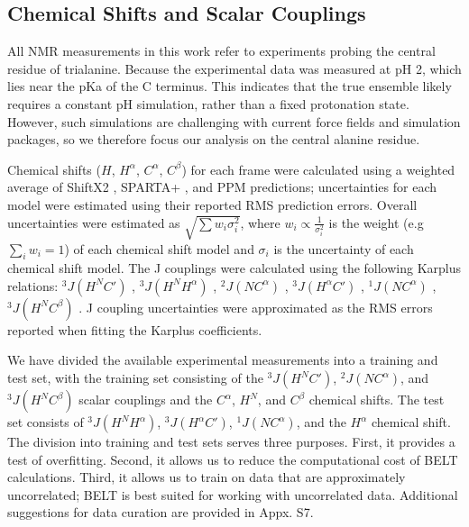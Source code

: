 \documentclass[11pt,titlepage]{article}
\begin{document}
\subsection*{Chemical Shifts and Scalar Couplings}

All NMR measurements in this work refer to experiments  \citep{Graf2007} probing the central residue of trialanine.  Because the experimental data was measured at pH 2, which lies near the pKa of the C terminus.  This indicates that the true ensemble likely requires a constant pH simulation, rather than a fixed protonation state.  However, such simulations are challenging with current force fields and simulation packages, so we therefore focus our analysis on the central alanine residue.  

Chemical shifts ($H$, $H^\alpha$, $C^\alpha$, $C^\beta$) for each frame were calculated using a weighted average of ShiftX2 \citep{han2011shiftx2}, SPARTA+  \citep{Shen2010}, and PPM \citep{li2012ppm} predictions; uncertainties for each model were estimated using their reported RMS prediction errors.  Overall uncertainties were estimated as $\sqrt{\sum w_i \sigma_i^2}$, where $w_i \propto \frac{1}{\sigma_i^2}$ is the weight (e.g $\sum_i w_i = 1$) of each chemical shift model and $\sigma_i$ is the uncertainty of each chemical shift model.  The J couplings were calculated using the following Karplus relations: $^3J(H^N C')$  \citep{vogeli2007limits}, $^3J(H^N H^\alpha)$  \citep{vogeli2007limits}, $^2J(N C^\alpha)$  \citep{Graf2007}, $^3J(H^\alpha C')$  \citep{Schmidt1999}, $^1J(N C^\alpha)$  \citep{Graf2007}, $^3J(H^N C^\beta)$  \citep{vogeli2007limits}.  J coupling uncertainties were approximated as the RMS errors reported when fitting the Karplus coefficients.  

We have divided the available experimental measurements into a training and test set, with the training set consisting of the $^3J(H^N C')$,  $^2J(N C^\alpha)$, and $^3J(H^N C^\beta)$ scalar couplings and the $C^\alpha$, $H^N$, and $C^\beta$ chemical shifts.  The test set consists of $^3J(H^N H^\alpha)$, $^3J(H^\alpha C')$, $^1J(N C^\alpha)$, and the $H^\alpha$ chemical shift.  The division into training and test sets serves three purposes.  First, it provides a test of overfitting.  Second, it allows us to reduce the computational cost of BELT calculations.  Third, it allows us to train on data that are approximately uncorrelated; BELT is best suited for working with uncorrelated data.  Additional suggestions for data curation are provided in Appx. S7.  
\end{document}
